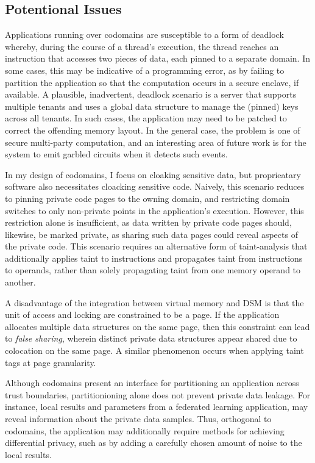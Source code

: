 \subsection{Potentional Issues}

%
Applications running over codomains are susceptible to a form of deadlock
whereby, during the course of a thread's execution, the thread reaches an
instruction that accesses two pieces of data, each pinned to a separate domain.
%
In some cases, this may be indicative of a programming error, as by failing to
partition the application so that the computation occurs in a secure enclave,
if available.
%
A plausible, inadvertent, deadlock scenario is a server that supports multiple
tenants and uses a global data structure to manage the (pinned) keys across all
tenants.
%
In such cases, the application may need to be patched to correct the offending
memory layout.
%
In the general case, the problem is one of secure multi-party computation, and
an interesting area of future work is for the system to emit garbled circuits
when it detects such events.


%
In my design of codomains, I focus on cloaking sensitive data, but
proprieatary software also necessitates cloacking sensitive code.
%
Naively, this scenario reduces to pinning private code pages to
the owning domain, and restricting domain switches to only
non-private points in the application's execution.
%
However, this restriction alone is insufficient, as data written by private
code pages should, likewise, be marked private, as sharing such data pages
could reveal aspects of the private code.
%
This scenario requires an alternative form of taint-analysis that additionally
applies taint to instructions and propagates taint from instructions to
operands, rather than solely propagating taint from one memory operand to
another.


%
A disadvantage of the integration between virtual memory and DSM is that the
unit of access and locking are constrained to be a page.
%
If the application allocates multiple data structures on the same page, then
this constraint can lead to \emph{false sharing}, wherein distinct private data
structures appear shared due to colocation on the same page.
%
A similar phenomenon occurs when applying taint tags at page granularity.


%
Although codomains present an interface for partitioning an application across
trust boundaries, partitionioning alone does not prevent private data leakage.
%
For instance, local results and parameters from a federated learning
application, may reveal information about the private data samples.
%
Thus, orthogonal to codomains, the application may additionally require
methods for achieving differential privacy, such as by adding a carefully
chosen amount of noise to the local results.


